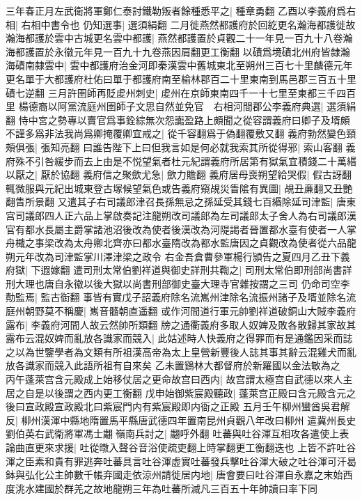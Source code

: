 三年春正月左武衛將軍鄭仁泰討鐵勒叛者餘種悉平之|{
	種章勇翻}
乙酉以李義府爲右相|{
	右相中書令也}
仍知選事|{
	選須絹翻}
二月徙燕然都護府於回紇更名瀚海都護徙故瀚海都護於雲中古城更名雲中都護|{
	燕然都護置於貞觀二十一年見一百九十八卷瀚海都護置於永徽元年見一百九十九卷燕因肩翻更工衡翻}
以磧爲境磧北州府皆隸瀚海磧南隸雲中|{
	雲中都護府治金河即秦漢雲中舊城東北至朔州三百七十里麟德元年更名單于大都護府杜佑曰單于都護府南至榆林郡百二十里東南到馬邑郡三百五十里磧七逆翻}
三月許圉師再貶䖍州刺史|{
	䖍州在京師東南四千一十七里至東都三千四百里}
楊德裔以阿黨流庭州圉師子文思自然並免官　右相河間郡公李義府典選|{
	選須絹翻}
恃中宮之勢專以賣官爲事銓綜無次怨讟盈路上頗聞之從容謂義府曰卿子及壻頗不謹多爲非法我尚爲卿掩覆卿宜戒之|{
	從千容翻爲于偽翻覆敷又翻}
義府勃然變色頸頰俱張|{
	張知亮翻}
曰誰告陛下上曰但我言如是何必就我索其所從得邪|{
	索山客翻}
義府殊不引咎緩步而去上由是不悦望氣者杜元紀謂義府所居第有獄氣宜積錢二十萬緡以厭之|{
	厭於協翻}
義府信之聚歛尤急|{
	歛力贍翻}
義府居母喪朔望給哭假|{
	假古訝翻}
輒微服與元紀出城東登古塜候望氣色或告義府窺覘災眚隂有異圖|{
	覘丑亷翻又丑艶翻眚所景翻}
又遣其子右司議郎津召長孫無忌之孫延受其錢七百緡除延司津監|{
	唐東宫司議郎四人正六品上掌啟奏記注龍朔改司議郎為左司議郎太子舍人為右司議郎漢官有都水長屬主爵掌諸池沼後改為使者後漢改為河隄謁者晉置都水臺有使者一人掌舟檝之事梁改為太舟卿北齊亦曰都水臺隋改為都水監唐因之貞觀改為使者從六品龍朔元年改為司津監掌川澤津梁之政令}
右金吾倉曹參軍楊行頴告之夏四月乙丑下義府獄|{
	下遐嫁翻}
遣司刑太常伯劉祥道與御史詳刑共鞫之|{
	司刑太常伯即刑部尚書詳刑大理也唐自永徽以後大獄以尚書刑部御史臺大理寺官雜按謂之三司}
仍命司空李勣監焉|{
	監古衘翻}
事皆有實戊子詔義府除名流嶲州津除名流振州諸子及壻並除名流庭州朝野莫不稱慶|{
	嶲音髓朝直遥翻}
或作河間道行軍元帥劉祥道破銅山大賊李義府露布|{
	李義府河間人故云然帥所類翻}
牓之通衢義府多取人奴婢及敗各散歸其家故其露布云混奴婢而亂放各識家而競入|{
	此姑述時人快義府之得罪而有是通鑑因采而誌之以為世鑒學者為文類有所祖漢高帝為太上皇營新豐後人誌其事其辭云混雞犬而亂放各識家而競入此語所祖有自來矣}
乙未置鷄林大都督府於新羅國以金法敏為之　丙午蓬萊宫含元殿成上始移仗居之更命故宫曰西内|{
	故宫謂太極宫自武德以來人主居之自是以後謂之西内更工衡翻}
戊申始御紫宸殿聽政|{
	蓬萊宫正殿曰含元殿含元之後曰宣政殿宣政殿北曰紫宸門内有紫宸殿即内衙之正殿}
五月壬午柳州蠻酋吳君解反|{
	柳州漢渾中縣地隋置馬平縣唐武德四年置南昆州貞觀八年改曰柳州}
遣冀州長史劉伯英右武衛將軍馮士翽嶺南兵討之|{
	翽呼外翻}
吐蕃與吐谷渾互相攻各遣使上表論曲直更來求援|{
	吐從暾入聲谷音浴使疏吏翻上時掌翻更工衡翻迭也}
上皆不許吐谷渾之臣素和貴有罪逃奔吐蕃具言吐谷渾虚實吐蕃發兵擊吐谷渾大破之吐谷渾可汗曷鉢與弘化公主帥數千帳弃國走依涼州請徙居内地|{
	唐會要曰吐谷渾自永嘉之末始西度洮水建國於群羌之故地龍朔三年為吐蕃所滅凡三百五十年帥讀曰率下同}
